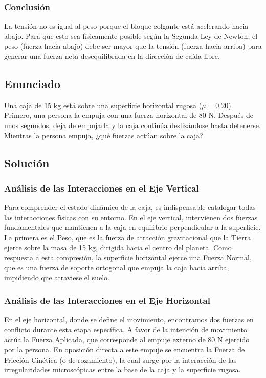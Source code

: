 \documentclass[12pt]{article}
\begin{document}
\subsubsection*{Conclusión}
La tensión no es igual al peso porque el bloque colgante está acelerando hacia abajo. Para que esto sea físicamente posible según la Segunda Ley de Newton, el peso (fuerza hacia abajo) debe ser mayor que la tensión (fuerza hacia arriba) para generar una fuerza neta desequilibrada en la dirección de caída libre.

\newpage

\subsection*{Enunciado}
Una caja de 15 kg está sobre una superficie horizontal rugosa ($\mu = 0.20$). Primero, una persona la empuja con una fuerza horizontal de 80 N. Después de unos segundos, deja de empujarla y la caja continúa deslizándose hasta detenerse. Mientras la persona empuja, ¿qué fuerzas actúan sobre la caja?

\subsection*{Solución}

\subsubsection*{Análisis de las Interacciones en el Eje Vertical}
Para comprender el estado dinámico de la caja, es indispensable catalogar todas las interacciones físicas con su entorno. En el eje vertical, intervienen dos fuerzas fundamentales que mantienen a la caja en equilibrio perpendicular a la superficie. La primera es el Peso, que es la fuerza de atracción gravitacional que la Tierra ejerce sobre la masa de 15 kg, dirigida hacia el centro del planeta. Como respuesta a esta compresión, la superficie horizontal ejerce una Fuerza Normal, que es una fuerza de soporte ortogonal que empuja la caja hacia arriba, impidiendo que atraviese el suelo.

\subsubsection*{Análisis de las Interacciones en el Eje Horizontal}
En el eje horizontal, donde se define el movimiento, encontramos dos fuerzas en conflicto durante esta etapa específica. A favor de la intención de movimiento actúa la Fuerza Aplicada, que corresponde al empuje externo de 80 N ejercido por la persona. En oposición directa a este empuje se encuentra la Fuerza de Fricción Cinética (o de rozamiento), la cual surge por la interacción de las irregularidades microscópicas entre la base de la caja y la superficie rugosa.
\end{document}
